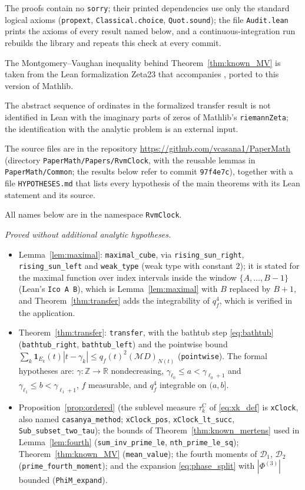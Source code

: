 \documentclass[11pt,a4paper]{article}
\makeatletter
\numberwithin{equation}{section}
\DeclareRobustCommand{\CGref}[1]{\ref{#1}}
\DeclareRobustCommand{\CGeqref}[1]{\eqref{#1}}
\DeclareRobustCommand{\CGcite}[2][]{\if\relax\detokenize{#1}\relax\cite{#2}\else\cite[#1]{#2}\fi}
\let\CG@origref\ref
\let\CG@origeqref\eqref
\newcommand{\CG@gettip}[1]{\@ifundefined{CGTip@#1}{#1}{\csname CGTip@#1\endcsname}}
\newcommand{\CG@getbib}[1]{\@ifundefined{CGBib@#1}{#1}{\csname CGBib@#1\endcsname}}
\DeclareRobustCommand{\CGref}[1]{\pdftooltip{\CG@origref{#1}}{\CG@gettip{#1}}}
\DeclareRobustCommand{\CGeqref}[1]{\pdftooltip{\CG@origeqref{#1}}{\CG@gettip{#1}}}
\DeclareRobustCommand{\CGcite}[2][]{\pdftooltip{\if\relax\detokenize{#1}\relax\cite{#2}\else\cite[#1]{#2}\fi}{\CG@getbib{#2}}}
\theoremstyle{definition}
\theoremstyle{remark}
\newcommand{\Ph}{\Phi}
\newcommand{\M}{\mathcal M}
\newcommand{\Ind}{\mathbf 1}
\newcommand{\Z}{\mathbb Z}
\newcommand{\R}{\mathbb R}
\makeatother
\begin{document}
The proofs contain no \texttt{sorry}; their printed dependencies use only the standard logical axioms (\texttt{propext}, \texttt{Classical.choice}, \texttt{Quot.sound}); the file \texttt{Audit.lean} prints the axioms of every result named below, and a continuous-integration run rebuilds the library and repeats this check at every commit.

The Montgomery--Vaughan inequality behind Theorem~\CGref{thm:known_MV} is taken from the Lean formalization Zeta23 that accompanies \CGcite{AlpogeFurmanZeta23}, ported to this version of Mathlib.

The abstract sequence of ordinates in the formalized transfer result is not identified in Lean with the imaginary parts of zeros of Mathlib's \texttt{riemannZeta}; the identification with the analytic problem is an external input.\par\noindent The source files are in the repository \url{https://github.com/vcasana1/PaperMath} \CGcite{CasanaPaperMath2026} (directory \texttt{PaperMath/Papers/RvmClock}, with the reusable lemmas in \texttt{PaperMath/Common}; the results below refer to commit \texttt{97f4e7c}), together with a file \texttt{HYPOTHESES.md} that lists every hypothesis of the main theorems with its Lean statement and its source.

All names below are in the namespace \texttt{RvmClock}.

\emph{Proved without additional analytic hypotheses.}
\begin{itemize}
\item Lemma~\CGref{lem:maximal}: \texttt{maximal\_cube}, via \texttt{rising\_sun\_right}, \texttt{rising\_sun\_left} and \texttt{weak\_type} (weak type with constant $2$); it is stated for the maximal function over index intervals inside the window $\{A,\dots,B-1\}$ (Lean's \texttt{Ico A B}), which is Lemma~\CGref{lem:maximal} with $B$ replaced by $B+1$, and Theorem~\CGref{thm:transfer} adds the integrability of $q_f^4$, which is verified in the application.
\item Theorem~\CGref{thm:transfer}: \texttt{transfer}, with the bathtub step \CGeqref{eq:bathtub} (\texttt{bathtub\_right}, \texttt{bathtub\_left}) and the pointwise bound $\sum_k\Ind_{E_k}(t)|t-\gamma_k|\le q_f(t)^2(\M D)_{N(t)}$ (\texttt{pointwise}). The formal hypotheses are: $\gamma:\Z\to\R$ nondecreasing, $\gamma_{\ell_0}\le a<\gamma_{\ell_0+1}$ and $\gamma_{\ell_1}\le b<\gamma_{\ell_1+1}$, $f$ measurable, and $q_f^4$ integrable on $(a,b]$.
\item Proposition~\CGref{prop:ordered} (the sublevel measure $\tau_{k}^{\mathrm C}$ of \CGeqref{eq:xk_def} is \texttt{xClock}, also named \texttt{casanya\_method}; \texttt{xClock\_pos}, \texttt{xClock\_lt\_succ}, \texttt{Sub\_subset\_two\_tau}); the bounds of Theorem~\CGref{thm:known_mertens} used in Lemma~\CGref{lem:fourth} (\texttt{sum\_inv\_prime\_le}, \texttt{nth\_prime\_le\_sq}); Theorem~\CGref{thm:known_MV} (\texttt{mean\_value}); the fourth moments of $\mathscr D_1$, $\mathscr D_2$ (\texttt{prime\_fourth\_moment}); and the expansion \CGeqref{eq:phase_split} with $|\Ph^{(3)}|$ bounded (\texttt{PhiM\_expand}).
\end{itemize}
\end{document}
